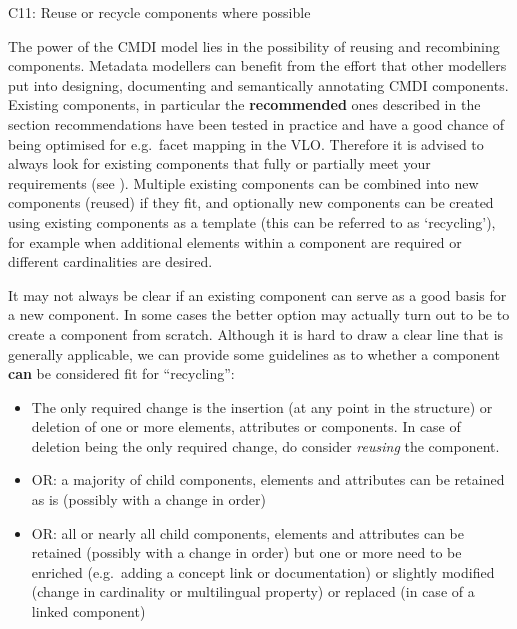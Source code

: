 C11: Reuse or recycle components where possible

 

The power of the CMDI model lies in the possibility of reusing and recombining components. Metadata modellers can benefit from the effort that other modellers put into designing, documenting and semantically annotating CMDI components. Existing components, in particular the \textbf{recommended} ones described in the section recommendations  have been tested in practice and have a good chance of being optimised for e.g.~facet mapping in the VLO. Therefore it is advised to always look for existing components that fully or partially meet your requirements (see ). Multiple existing components can be combined into new components (reused) if they fit, and optionally new components can be created using existing components as a template (this can be referred to as `recycling'), for example when additional elements within a component are required or different cardinalities are desired.


It may not always be clear if an existing component can serve as a good basis for a new component. In some cases the better option may actually turn out to be to create a component from scratch. Although it is hard to draw a clear line that is generally applicable, we can provide some guidelines as to whether a component \textbf{can} be considered fit for
``recycling'':

\begin{itemize}
\tightlist
\item
  The only required change is the insertion (at any point in the structure) or deletion of one or more elements, attributes or components. In case of deletion being the only required change, do consider \emph{reusing} the component.
\item
  OR: a majority of child components, elements and attributes can be retained as is (possibly with a change in order)
\item
  OR: all or nearly all child components, elements and attributes can be retained (possibly with a change in order) but one or more need to be enriched (e.g.~adding a concept link or documentation) or slightly modified (change in cardinality or multilingual property) or replaced (in case of a linked component)
\end{itemize}

